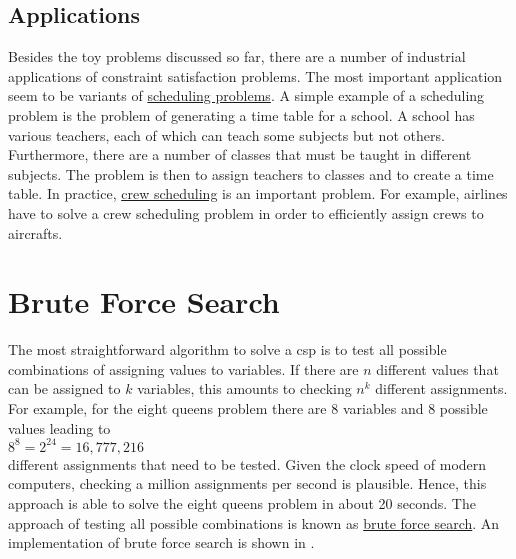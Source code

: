 \subsection{Applications}
Besides the toy problems discussed so far, there are a number of industrial applications of constraint
satisfaction problems.  The most important application seem to be variants of
\href{https://en.wikipedia.org/wiki/Scheduling_(production_processes)}{scheduling problems}. 
A simple example of a scheduling problem is the problem of generating a time table for a school.  A school has
various teachers, each of which can teach some subjects but not others.  Furthermore, there are a number of
classes that must be taught in different subjects.  The problem is then to assign teachers to classes and to
create a time table.  In practice, \href{https://en.wikipedia.org/wiki/Crew_scheduling}{crew scheduling} is an
important problem.  For example, airlines have to solve a crew scheduling problem in order to efficiently
assign crews to aircrafts.

\section{Brute Force Search}
The most straightforward algorithm to solve a \ac{csp} is to test all possible combinations of assigning
values to variables.  If there are $n$ different values that can be assigned to $k$ variables, this amounts to 
checking $n^k$ different assignments.  For example, for the eight queens problem there are 8 variables and
8 possible values leading to 
\\[0.2cm]
\hspace*{1.3cm}
$8^8 = 2^{24} = 16,777,216$
\\[0.2cm]
different assignments that need to be tested.  Given the clock speed of modern computers, checking a million
assignments per second is plausible.  Hence, this approach is able to solve the eight queens problem in
about 20 seconds.  The approach of testing all possible combinations is known as
\href{https://en.wikipedia.org/wiki/Brute-force_search}{brute force search}.  
An implementation of brute force search is shown in . 

